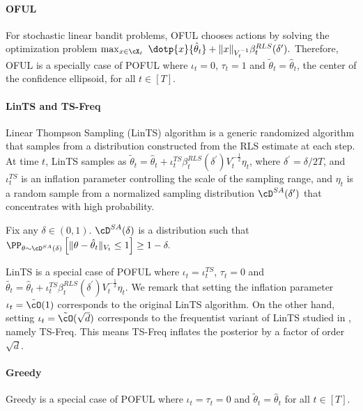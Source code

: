 \paragraph{OFUL} 
For stochastic linear bandit problems, OFUL chooses actions by solving the optimization problem 
	$
	\max_{x\in\cX_t}  \   \dotp{x}{ \hat{\theta}_t}  + \|x\|_{V_t^{-1}}   \beta^{RLS}_t(\delta^\prime).
	$
Therefore, OFUL is a specially case of POFUL where $\iota_t = 0$, $\tau_t = 1$ and $
\tilde{\theta}_t = \hat{\theta}_t$, the center of the confidence ellipsoid, for all $t\in[T]$.

\paragraph{LinTS and TS-Freq}	
Linear Thompson Sampling (LinTS) algorithm is a generic randomized algorithm that samples from a distribution constructed from the RLS estimate at each step. At time $t$, LinTS samples as $\tilde{\theta}_{t}  =\hat{\theta}_t +\iota^{TS}_t \beta_t^{RLS} (\delta^\prime) V_t^{-\frac{1}{2}} \eta_t$, where $\delta^\prime = \delta/2T$, and $\iota^{TS}_t$ is an inflation parameter controlling the scale of the sampling range, and $\eta_t$ is a random sample from a normalized sampling distribution $\cD^{SA}(\delta^\prime)$ that concentrates with high probability. 


\begin{definition}
	 Fix any $\delta \in (0,1)$. $\cD^{SA} (\delta) $  is a distribution such that $
	\PP_{\theta \sim \cD^{SA}(\delta)}\left[\|\theta - \hparam_t\|_{V_t} \leq 1\right] \geq 1 - \delta.
	$
	\end{definition}
LinTS is a special case of POFUL where  $\iota_t = \iota^{TS}_t$, $\tau_t = 0$ and $\tilde{\theta_t} = \hat{\theta}_t +\iota^{TS}_t \beta_t^{RLS} (\delta^\prime) V_t^{-\frac{1}{2}} \eta_t$. We remark that setting the inflation parameter $\iota_t = \tilde{\cO}(1)$ corresponds to the original LinTS algorithm. On the other hand,  setting $\iota_t= \tilde{\cO}(\sqrt{d})$  corresponds to the frequentist variant of LinTS studied in \cite{agrawal2013thompson,abeille2017linear}, namely TS-Freq. This means TS-Freq inflates the posterior by a factor of order $\sqrt{d}$.
\paragraph{Greedy} Greedy is a special case of POFUL where $\iota_t = \tau_t = 0$ and $\tilde{\theta}_t = \hat{\theta}_t$  for all $t\in[T]$.


